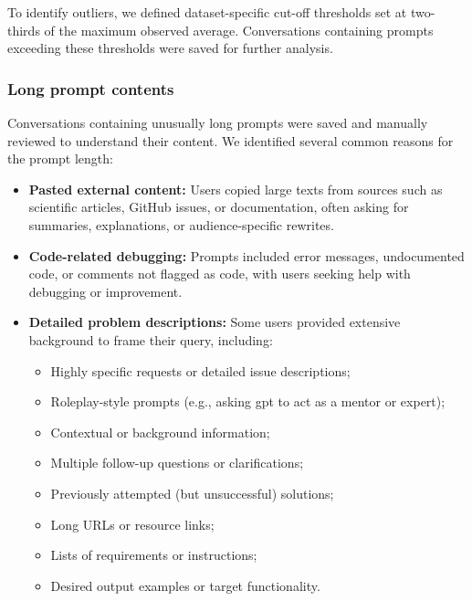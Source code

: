 To identify outliers, we defined dataset-specific cut-off thresholds set at two-thirds of the maximum observed average. Conversations containing prompts exceeding these thresholds were saved for further analysis.

\subsubsection{Long prompt contents}
Conversations containing unusually long prompts were saved and manually reviewed to understand their content. We identified several common reasons for the prompt length:
\begin{itemize}
    \item \textbf{Pasted external content:} Users copied large texts from sources such as scientific articles, GitHub issues, or documentation, often asking for summaries, explanations, or audience-specific rewrites.
    \item \textbf{Code-related debugging:} Prompts included error messages, undocumented code, or comments not flagged as code, with users seeking help with debugging or improvement.
    \item \textbf{Detailed problem descriptions: } Some users provided extensive background to frame their query, including:
    \begin{itemize}
        \item Highly specific requests or detailed issue descriptions;
        \item Roleplay-style prompts (e.g., asking \gls{gpt} to act as a mentor or expert);
        \item Contextual or background information;
        \item Multiple follow-up questions or clarifications;
        \item Previously attempted (but unsuccessful) solutions;
        \item Long URLs or resource links;
        \item Lists of requirements or instructions;
        \item Desired output examples or target functionality.
    \end{itemize}
\end{itemize}
